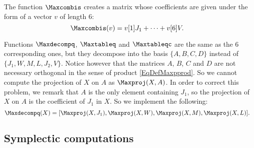 The function $\Maxcombis$ creates a matrix whose coefficients are given under the form of a vector $v$ of length $6$:
\[
	\Maxcombis(v)=v[1]J_{1}+\cdots+v[6]V.
\]

Functions $\Maxdecompq$, $\Maxtableq$ and $\Maxtableqc$ are the same as the $6$ corresponding ones, but they decompose into the basis $\{A,B,C,D\}$ instead of  $\{ J_{1},W,M,L,J_{2},V \}$. Notice however that the matrices $A$, $B$, $C$ and $D$ are not necessary orthogonal in the sense of  product \eqref{EqDefMaxpprod}. So we cannot compute the projection of $X$ on $A$ as $\Maxproj(X,A)$. In order to correct this problem, we remark that $A$ is the only element containing $J_{1}$, so the projection of $X$ on $A$ is the coefficient of $J_{1}$ in $X$. So we implement the following:
\[
	\Maxdecompq(X)=[\Maxproj(X,J_{1}),\Maxproj(X,W),\Maxproj(X,M),\Maxproj(X,L)].
\]



\subsection{Symplectic computations}

